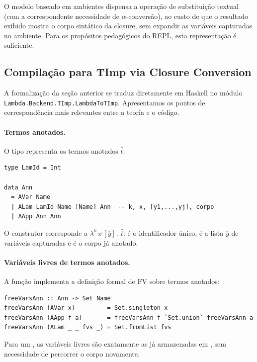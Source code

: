 O modelo baseado em ambientes dispensa a operação de substituição
textual (com a correspondente necessidade de \(\alpha\)-conversão),
ao custo de que o resultado exibido mostra o corpo sintático da
closure, sem expandir as variáveis capturadas no ambiente. Para os
propósitos pedagógicos do REPL, esta representação é suficiente.

\subsection{Compilação para TImp via Closure Conversion}

A formalização da seção anterior se traduz diretamente em Haskell no
módulo \verb|Lambda.Backend.TImp.LambdaToTImp|. Apresentamos os
pontos de correspondência mais relevantes entre a teoria e o código.

\paragraph{Termos anotados.}

O tipo  representa os termos anotados \(\hat{t}\):

\begin{verbatim}
type LamId = Int

data Ann
  = AVar Name
  | ALam LamId Name [Name] Ann  -- k, x, [y1,...,yj], corpo
  | AApp Ann Ann
\end{verbatim}

O construtor  corresponde a
\(\lambda^k\, x\,[\overline{y}]\,.\;\hat{t}\):  é o
identificador único,  é a lista \(\overline{y}\) de
variáveis capturadas e  é o corpo já anotado.

\paragraph{Variáveis livres de termos anotados.}

A função  implementa a definição formal de
\(\mathrm{FV}\) sobre termos anotados:

\begin{verbatim}
freeVarsAnn :: Ann -> Set Name
freeVarsAnn (AVar x)         = Set.singleton x
freeVarsAnn (AApp f a)       = freeVarsAnn f `Set.union` freeVarsAnn a
freeVarsAnn (ALam _ _ fvs _) = Set.fromList fvs
\end{verbatim}

Para um , as variáveis livres são exatamente as já
armazenadas em , sem necessidade de percorrer o corpo
novamente.

